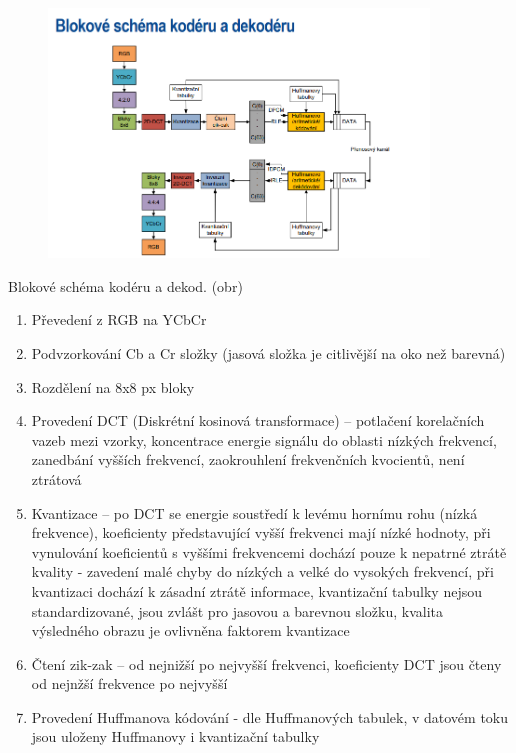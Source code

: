 \begin{figure} [h]
     \centering
     \includegraphics[width=0.9\textwidth]{images/jpeg.PNG}
\end{figure}

Blokové schéma kodéru a dekod. (obr)
\begin{enumerate}
    \item Převedení z RGB na YCbCr
    \item Podvzorkování Cb a Cr složky (jasová složka je citlivější na oko než barevná)
    \item Rozdělení na 8x8 px bloky
    \item Provedení DCT (Diskrétní kosinová transformace) – potlačení korelačních vazeb mezi vzorky, koncentrace energie signálu do oblasti nízkých frekvencí, zanedbání vyšších frekvencí, zaokrouhlení frekvenčních kvocientů, není ztrátová
    \item Kvantizace – po DCT se energie soustředí k levému hornímu rohu (nízká frekvence), koeficienty představující vyšší frekvenci mají nízké hodnoty, při vynulování koeficientů s vyššími frekvencemi dochází pouze k nepatrné ztrátě kvality - zavedení malé chyby do nízkých a velké do vysokých frekvencí, při kvantizaci dochází k zásadní ztrátě informace, kvantizační tabulky nejsou standardizované, jsou zvlášt pro jasovou a barevnou složku, kvalita výsledného obrazu je ovlivněna faktorem kvantizace
    \item Čtení zik-zak – od nejnižší po nejvyšší frekvenci, koeficienty DCT jsou čteny od nejnžší frekvence po nejvyšší
    \item Provedení Huffmanova kódování - dle Huffmanových tabulek, v datovém toku jsou uloženy Huffmanovy i kvantizační tabulky
\end{enumerate}


